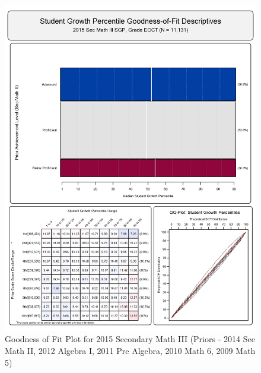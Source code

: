 \documentclass[12pt]{article}
\begin{document}
\begin{figure}[htbp]
\centering
\includegraphics{../img/Goodness_of_Fit/SEC_MATH_III.2015/2015_SEC_MATH_III_EOCT;2014_SEC_MATH_II_EOCT;2012_ALGEBRA_I_EOCT;2011_PRE_ALGEBRA_EOCT;2010_MATH_6;2009_MATH_5.png}
\caption{Goodness of Fit Plot for 2015 Secondary Math III (Priors - 2014
Sec Math II, 2012 Algebra I, 2011 Pre Algebra, 2010 Math 6, 2009 Math
5)}
\end{figure}
\end{document}

